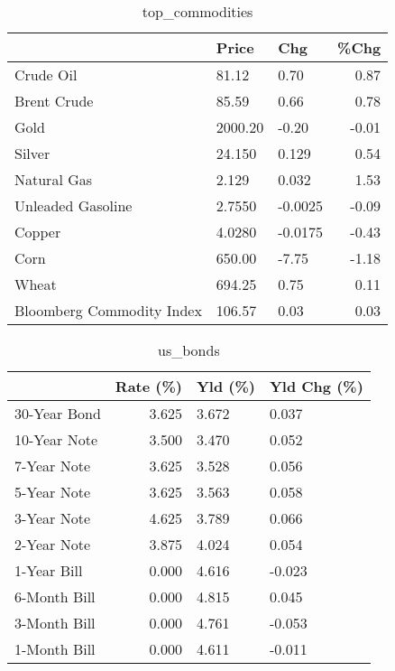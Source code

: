 \documentclass{article}%
\begin{document}
\begin{table}[htbp]%
\caption{top\_commodities}%
\centering%
\begin{adjustbox}{width=1\textwidth}%
\begin{tabular}{lllr}
\toprule
                          &   Price &     Chg &  \%Chg \\
\midrule
               Crude Oil  &   81.12 &    0.70 &  0.87 \\
             Brent Crude  &   85.59 &    0.66 &  0.78 \\
                    Gold  & 2000.20 &   -0.20 & -0.01 \\
                  Silver  &  24.150 &   0.129 &  0.54 \\
             Natural Gas  &   2.129 &   0.032 &  1.53 \\
       Unleaded Gasoline  &  2.7550 & -0.0025 & -0.09 \\
                  Copper  &  4.0280 & -0.0175 & -0.43 \\
                    Corn  &  650.00 &   -7.75 & -1.18 \\
                   Wheat  &  694.25 &    0.75 &  0.11 \\
Bloomberg Commodity Index &  106.57 &    0.03 &  0.03 \\
\bottomrule
\end{tabular}
%
\end{adjustbox}%
\end{table}

%


\begin{table}[htbp]%
\caption{us\_bonds}%
\centering%
\begin{adjustbox}{width=1\textwidth}%
\begin{tabular}{lrll}
\toprule
             &  Rate (\%) & Yld (\%) & Yld Chg (\%) \\
\midrule
30-Year Bond &     3.625 &   3.672 &       0.037 \\
10-Year Note &     3.500 &   3.470 &       0.052 \\
 7-Year Note &     3.625 &   3.528 &       0.056 \\
 5-Year Note &     3.625 &   3.563 &       0.058 \\
 3-Year Note &     4.625 &   3.789 &       0.066 \\
 2-Year Note &     3.875 &   4.024 &       0.054 \\
 1-Year Bill &     0.000 &   4.616 &      -0.023 \\
6-Month Bill &     0.000 &   4.815 &       0.045 \\
3-Month Bill &     0.000 &   4.761 &      -0.053 \\
1-Month Bill &     0.000 &   4.611 &      -0.011 \\
\bottomrule
\end{tabular}
%
\end{adjustbox}%
\end{table}
\end{document}
